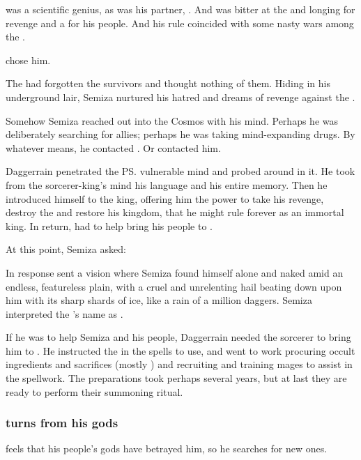 \Semiza{} was a scientific genius, as was his partner, \Eshayzal. 
And \Semiza{} was bitter at the \dragons{} and longing for revenge and a  for his people. 
And his rule coincided with some nasty wars among the \dragons. 

\Daggerrain{} chose him. 

The \dragons{} had forgotten the \nephil{} survivors and thought nothing of them. 
Hiding in his underground lair, Semiza nurtured his hatred and dreams of revenge against the \dragons{}. 

Somehow Semiza reached out into the Cosmos with his mind. 
Perhaps he was deliberately searching for allies; perhaps he was taking mind-expanding drugs. 
By whatever means, he contacted \Daggerrain. 
Or \Daggerrain{} contacted him. 

Daggerrain penetrated the \ps{\nephil} vulnerable mind and probed around in it. 
He took from the sorcerer-king's mind his language and his entire memory. 
Then he introduced himself to the \nephil{} king, offering him the power to take his revenge, destroy the \dragons{} and restore his kingdom, that he might rule forever as an immortal king. 
In return, \Semiza{} had to help \Daggerrain{} bring his people to \Miith{}. 

At this point, Semiza asked: 

In response \Daggerrain{} sent a vision where Semiza found himself alone and naked amid an endless, featureless plain, with a cruel and unrelenting hail beating down upon him with its sharp shards of ice, like a rain of a million daggers. 
Semiza interpreted the \banelord{}'s name as . 

If he was to help Semiza and his people, Daggerrain needed the \nephil{} sorcerer to bring him to \Miith{}. 
He instructed the \nephil{} in the spells to use, and \Semiza{} went to work procuring occult ingredients and sacrifices (mostly \scathae) and recruiting and training mages to assist in the spellwork. 
The preparations took perhaps several years, but at last they are ready to perform their summoning ritual. 







\subsubsection{\Semiza{} turns from his gods}
\Semiza{} feels that his people's gods have betrayed him, so he searches for new ones. 

